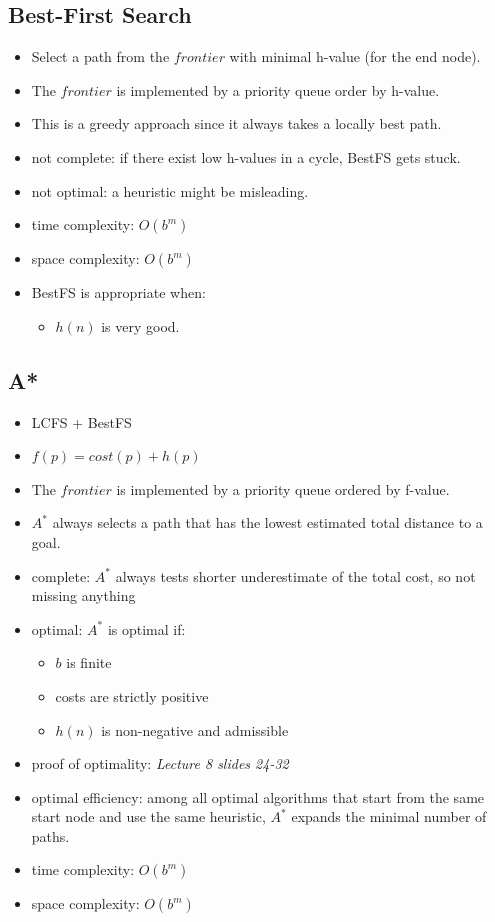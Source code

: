 \documentclass{article}
\begin{document}
\subsection{Best-First Search}

\begin{itemize}
    \item Select a path from the $frontier$ with minimal h-value (for the end node).
    \item The $frontier$ is implemented by a priority queue order by h-value.
    \item This is a greedy approach since it always takes a locally best path.
    \item not complete: if there exist low h-values in a cycle, BestFS gets stuck.
    \item not optimal: a heuristic might be misleading.
    \item time complexity: $O(b^m)$
    \item space complexity: $O(b^m)$
    \item BestFS is appropriate when:
        \begin{itemize}
            \item $h(n)$ is very good.
        \end{itemize}
\end{itemize}

\subsection{A*}

\begin{itemize}
    \item LCFS + BestFS
    \item $f(p) = cost(p) + h(p)$
    \item The $frontier$ is implemented by a priority queue ordered by f-value.
    \item $A^{*}$ always selects a path that has the lowest estimated total distance to a goal.
    \item complete: $A^{*}$ always tests shorter underestimate of the total cost, so not missing anything
    \item optimal: $A^{*}$ is optimal if:
        \begin{itemize}
            \item $b$ is finite
            \item costs are strictly positive
            \item $h(n)$ is non-negative and admissible
        \end{itemize}
    \item proof of optimality: \textit{Lecture 8 slides 24-32}
    \item optimal efficiency: among all optimal algorithms that start from the same start node and use the same heuristic, $A^{*}$ expands the minimal number of paths.
    \item time complexity: $O(b^m)$
    \item space complexity: $O(b^m)$
\end{itemize}
\end{document}
